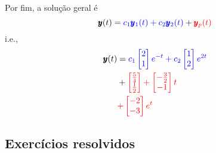 \begin{ex}
  Por fim, a solução geral é
  \begin{equation}
    \pmb{y}(t) = {\color{blue}c_1\pmb{y}_1(t) + c_2\pmb{y}_2(t)} + {\color{red}\pmb{y}_p(t)}
  \end{equation}
  i.e.,
  \begin{align}
    \pmb{y}(t) &= {\color{blue}c_1\begin{bmatrix}
      2\\
      1
      \end{bmatrix}e^{-t}
      + c_2\begin{bmatrix}
      1\\
      2
      \end{bmatrix}e^{2t}}\\
    &+ {\color{red}\begin{bmatrix}
        \frac{5}{4} \\
        \frac{1}{2}
      \end{bmatrix}
      +   \begin{bmatrix}
        -\frac{3}{2} \\
        -1
      \end{bmatrix}t}\\
    &{\color{red}+   \begin{bmatrix}
         -2 \\
         -3
       \end{bmatrix}e^t}
  \end{align}
\end{ex}

\subsection*{Exercícios resolvidos}

